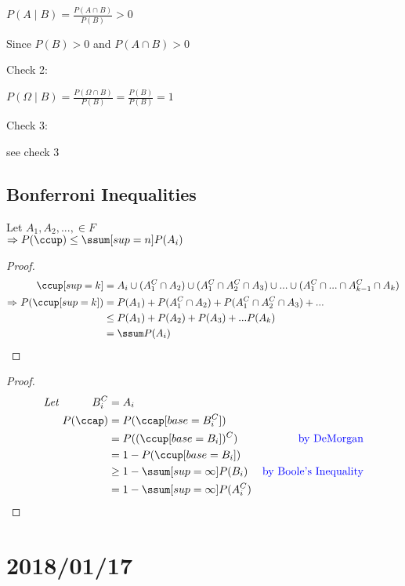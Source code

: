 \documentclass[12pt]{article}
\newcommand{\mathcomment}[0]{\quad\color{blue}}
\begin{document}
\(P(A \mid B) = \frac{P(A \cap B)}{P(B)} > 0\)

Since \(P(B) > 0\) and \(P(A \cap B) > 0\)

Check 2:

\(P(\Omega \mid B) = \frac{P(\Omega \cap B)}{P(B)} = \frac{P(B)}{P(B)} = 1\)

Check 3:

see check 3

\subsection{Bonferroni Inequalities}
Let $A_1, A_2, ..., \in F$ \\
$\Rightarrow P(\ccup) \le \ssum[sup=n] P(A_i)$

\begin{proof}
	\begin{equation}
		\begin{alignedat}{2}
			&& \ccup[sup=k] &= A_i \cup (A^C_1 \cap A_2) \cup (A^C_1 \cap A^C_2 \cap A_3) \cup ... \cup (A^C_1 \cap ... \cap A^C_{k-1} \cap A_k) \\
			\Rightarrow \ && P(\ccup[sup=k]) &= P(A_1) + P(A^C_1 \cap A_2) + P(A^C_1 \cap A^C_2 \cap A_3) + ... \\
			&&& \le P(A_1) + P(A_2) + P(A_3) + ... P(A_k) \\
			&&&= \ssum P(A_i)
		\end{alignedat}
	\end{equation}
\end{proof}

\begin{proof}
	\begin{equation}
		\begin{alignedat}{3}
		\textit{Let } && B^C_i &= A_i &\\
		&& P(\ccap) &= P(\ccap[base=B^C_i]) &\\
		&& &= P((\ccup[base=B_i])^C) & \mathcomment \text{by DeMorgan} \\
		&& &= 1 - P(\ccup[base=B_i]) &\\
		&& & \ge 1 - \ssum[sup=\infty] P(B_i) & \mathcomment \text{by Boole's Inequality} \\
		&& &= 1 - \ssum[sup=\infty]P(A^C_i)
		\end{alignedat}
	\end{equation}
\end{proof}

\section{2018/01/17}
\end{document}
